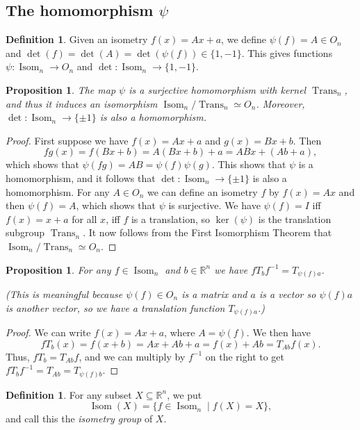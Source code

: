 \documentclass{amsart}
\DeclareMathOperator{\Trans}    {Trans}
\DeclareMathOperator{\Isom}     {Isom}
\newcommand{\R}         {{\mathbb{R}}}
\newcommand{\st}        {\;|\;}
\newcommand{\xra}       {\xrightarrow}
\newcommand{\sse}       {\subseteq}
\renewcommand{\:}{\colon}
\newtheorem{proposition}[theorem]{Proposition}
\theoremstyle{definition}
\newtheorem{definition}[theorem]{Definition}
\begin{document}
\subsection{The homomorphism $\psi$}
\label{subsec-psi}

\begin{definition}\label{defn-psi}
 Given an isometry $f(x)=Ax+a$, we define $\psi(f)=A\in O_n$ and
 $\det(f)=\det(A)=\det(\psi(f))\in\{1,-1\}$.  This
 gives functions $\psi\:\Isom_n\xra{}O_n$ and
 $\det\:\Isom_n\xra{}\{1,-1\}$. 
\end{definition}

\begin{proposition}
 The map $\psi$ is a surjective homomorphism with kernel $\Trans_n$, and
 thus it induces an isomorphism $\Isom_n/\Trans_n\simeq O_n$.
 Moreover, $\det\:\Isom_n\xra{}\{\pm 1\}$ is also a homomorphism.
\end{proposition}
\begin{proof}
 First suppose we have $f(x)=Ax+a$ and $g(x)=Bx+b$.  Then
 \[ fg(x) = f(Bx+b) = A(Bx+b)+a = ABx + (Ab+a), \]
 which shows that $\psi(fg)=AB=\psi(f)\psi(g)$.  This shows that
 $\psi$ is a homomorphism, and it follows that
 $\det\:\Isom_n\xra{}\{\pm 1\}$ is also a homomorphism.  For any
  $A\in O_n$ we can define an isometry $f$ by $f(x)=Ax$ and then
 $\psi(f)=A$, which shows that $\psi$ is surjective.  We have
 $\psi(f)=I$ iff $f(x)=x+a$ for all $x$, iff $f$ is a translation, so
 $\ker(\psi)$ is the translation subgroup $\Trans_n$.  It now follows
 from the First Isomorphism Theorem that $\Isom_n/\Trans_n\simeq O_n$.
\end{proof}

\begin{proposition}\label{prop-semidirect}
 For any $f\in \Isom_n$ and $b\in\R^n$ we have
 $f T_b f^{-1}=T_{\psi(f)a}$.

 (This is meaningful because $\psi(f)\in O_n$ is a matrix and $a$ is a
 vector so $\psi(f)a$ is another vector, so we have a translation
 function $T_{\psi(f)a}$.)
\end{proposition}
\begin{proof}
 We can write $f(x)=Ax+a$, where $A=\psi(f)$.  We then have
 \[ f T_b(x) = f(x+b) = Ax + Ab + a = f(x) + Ab = T_{Ab} f(x). \]
 Thus, $fT_b=T_{Ab}f$, and we can multiply by $f^{-1}$ on the right to
 get $fT_bf^{-1}=T_{Ab}=T_{\psi(f)b}$.
\end{proof}

\begin{definition}
 For any subset $X\sse\R^n$, we put 
 \[ \Isom(X)=\{f\in \Isom_n\st f(X)=X\}, \]
 and call this the \emph{isometry group} of $X$.
\end{definition}
\end{document}
